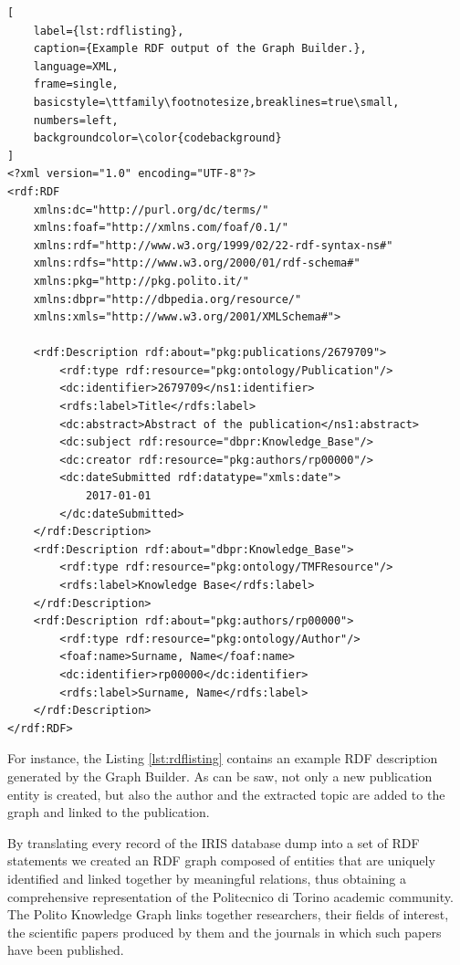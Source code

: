 \documentclass[%
    corpo=13.5pt,
    twoside,
    oldstyle,
    tipotesi=magistrale,
    greek,
    evenboxes
]{toptesi}
\begin{document}
\begin{lstlisting}[
    label={lst:rdflisting},
    caption={Example RDF output of the Graph Builder.},
    language=XML,
    frame=single,
    basicstyle=\ttfamily\footnotesize,breaklines=true\small,
    numbers=left,
    backgroundcolor=\color{codebackground}
]
<?xml version="1.0" encoding="UTF-8"?>
<rdf:RDF
    xmlns:dc="http://purl.org/dc/terms/"
    xmlns:foaf="http://xmlns.com/foaf/0.1/"
    xmlns:rdf="http://www.w3.org/1999/02/22-rdf-syntax-ns#"
    xmlns:rdfs="http://www.w3.org/2000/01/rdf-schema#"
    xmlns:pkg="http://pkg.polito.it/"
    xmlns:dbpr="http://dbpedia.org/resource/"
    xmlns:xmls="http://www.w3.org/2001/XMLSchema#">

    <rdf:Description rdf:about="pkg:publications/2679709">
        <rdf:type rdf:resource="pkg:ontology/Publication"/>
        <dc:identifier>2679709</ns1:identifier>
        <rdfs:label>Title</rdfs:label>
        <dc:abstract>Abstract of the publication</ns1:abstract>
        <dc:subject rdf:resource="dbpr:Knowledge_Base"/>
        <dc:creator rdf:resource="pkg:authors/rp00000"/>
        <dc:dateSubmitted rdf:datatype="xmls:date">
            2017-01-01
        </dc:dateSubmitted>
    </rdf:Description>
    <rdf:Description rdf:about="dbpr:Knowledge_Base">
        <rdf:type rdf:resource="pkg:ontology/TMFResource"/>
        <rdfs:label>Knowledge Base</rdfs:label>
    </rdf:Description>
    <rdf:Description rdf:about="pkg:authors/rp00000">
        <rdf:type rdf:resource="pkg:ontology/Author"/>
        <foaf:name>Surname, Name</foaf:name>
        <dc:identifier>rp00000</dc:identifier>
        <rdfs:label>Surname, Name</rdfs:label>
    </rdf:Description>
</rdf:RDF>
\end{lstlisting}


For instance, the Listing \ref{lst:rdflisting} contains an example RDF description
generated by the Graph Builder. As can be saw, not only a new
publication entity is created, but also the author and the extracted topic are
added to the graph and linked to the publication.

By translating every record of the IRIS database dump into a set of
RDF statements we created an RDF graph composed of entities that are uniquely
identified and linked together by meaningful relations, thus obtaining a
comprehensive representation of the Politecnico di Torino academic community.
The Polito Knowledge Graph links together researchers, their fields of
interest, the scientific papers produced by them and the journals in which
such papers have been published.
\end{document}
